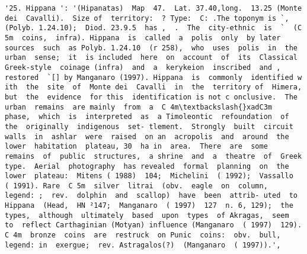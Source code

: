 \documentclass[11pt]{article}
\begin{document}
\begin{Verbatim}[commandchars=\\\{\}]
         '25. Hippana ': '(Hipanatas)  Map  47.  Lat. 37.40,long.  13.25 (Monte  dei  Cavalli).  Size of  territory:  ? Type:  C: .The toponym is `,  (Polyb. 1.24.10);  Diod. 23.9.5  has ,  .  The  city-ethnic  is  `  (C 5m  coins,  infra). Hippana  is  called  a  polis  only  by later  sources  such  as Polyb. 1.24.10  (r 258),  who  uses  polis  in  the  urban  sense;  it  is included  here  on  account  of  its  Classical  Greek-style  coinage (infra)  and  a  kerykeion  inscribed  and , restored  `[] by Manganaro (1997). Hippana  is  commonly  identified w ith  the  site  of  Monte dei  Cavalli  in  the  territory of  Himera,  but  the  evidence  for this  identification is not c onclusive.  The  urban  remains  are mainly  from  a  C 4m\textbackslash{}xadC3m  phase,  which  is  interpreted  as  a Timoleontic  refoundation  of  the  originally  indigenous  set- tlement.  Strongly  built  circuit  walls  in  ashlar  were  raised  on an  acropolis  and  around  the  lower  habitation  plateau, 30  ha in  area.  There  are  some  remains  of  public  structures,  a shrine  and  a  theatre  of  Greek  type.  Aerial  photography  has revealed  formal  planning  on  the  lower  plateau:  Mitens ( 1988)  104;  Michelini  ( 1992);  Vassallo  ( 1991). Rare  C 5m  silver  litrai  (obv.  eagle  on  column,  legend: ;  rev.  dolphin  and  scallop)  have  been  attrib- uted  to  Hippana  (Head,  HN ²147;  Manganaro  ( 1997)  127  n. 6, 129);  the  types,  although  ultimately  based  upon  types  of Akragas,  seem  to  reflect Carthaginian (Motyan) influence (Manganaro  ( 1997)  129).  C 4m  bronze  coins  are  restruck  on Punic  coins:  obv.  bull,  legend: in  exergue;  rev. Astragalos(?)  (Manganaro  ( 1997)).',

\end{Verbatim}
\end{document}
